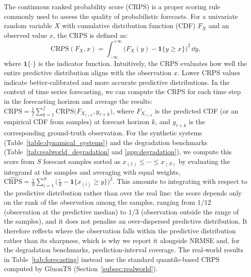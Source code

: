 \documentclass[preprint,12pt,authoryear]{elsarticle}
\newcommand{\oldrev}[1]{#1}
\newcommand{\rev}[1]{#1}
\newcommand{\rev}[1]{\textcolor{blue}{#1}}
\begin{document}
The continuous ranked probability score (CRPS) is a proper scoring rule commonly used to assess the quality of probabilistic forecasts. For a univariate random variable $X$ with cumulative distribution function (CDF) $F_X$ and an observed value $x$, the CRPS is defined as:
\begin{equation}
    \text{CRPS}(F_X, x) = \int_{-\infty}^{+\infty} \bigl(F_X(y) - \mathbf{1}\{y \geq x\}\bigr)^2 \, \dd y,
\end{equation}
where $\mathbf{1}\{\cdot\}$ is the indicator function. Intuitively, the CRPS evaluates how well the entire predictive distribution aligns with the observation $x$. Lower CRPS values indicate better-calibrated and more accurate predictive distributions.
In the context of time series forecasting, we can compute the CRPS for each time step in the forecasting horizon and average the results:
\oldrev{$\overline{\text{CRPS}} = \tfrac{1}{f} \sum_{k=1}^{f} \text{CRPS}\bigl(F_{X_{\tau+k}}, y_{\tau+k}\bigr)$},
where $F_{X_{\tau+k}}$ is the predicted CDF (or an empirical CDF from samples) at forecast horizon $k$, and $y_{\tau+k}$ is the corresponding ground-truth observation.
\rev{For the synthetic systems (Table~\ref{table:dynamical_systems}) and the degradation benchmarks (Table~\ref{tab:realworld_degradation} and \ref{app:degradation}), we compute this score from $S$ forecast samples sorted as $x_{(1)} \leq \cdots \leq x_{(S)}$ by evaluating the integrand at the samples and averaging with equal weights, $\widehat{\text{CRPS}} = \tfrac{1}{S}\sum_{i=1}^{S} \bigl(\tfrac{i}{S} - \mathbf{1}\{x_{(i)} \geq y\}\bigr)^2$. This amounts to integrating with respect to the predictive distribution rather than over the real line: the score depends only on the rank of the observation among the samples, ranging from $1/12$ (observation at the predictive median) to $1/3$ (observation outside the range of the samples), and it does not penalise an over-dispersed predictive distribution. It therefore reflects where the observation falls within the predictive distribution rather than its sharpness, which is why we report it alongside NRMSE and, for the degradation benchmarks, prediction-interval coverage. The real-world results in Table~\ref{tab:forecasting} instead use the standard quantile-based CRPS computed by GluonTS (Section~\ref{subsec:realworld}).}
\end{document}
